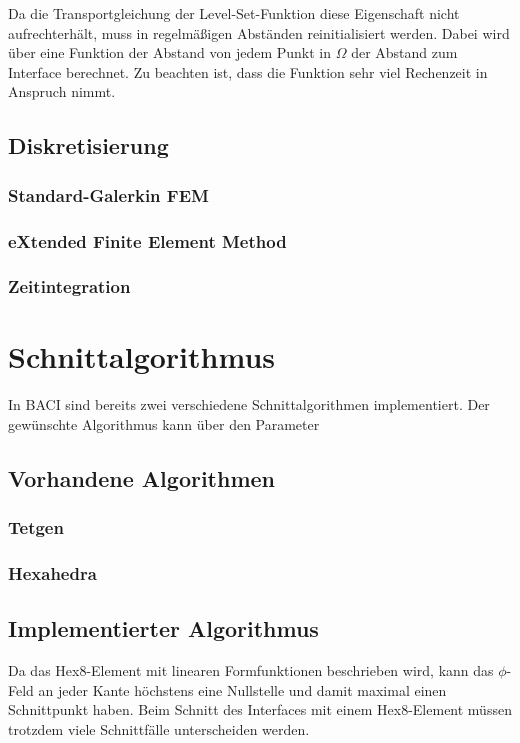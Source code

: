 Da die Transportgleichung der Level-Set-Funktion diese Eigenschaft nicht aufrechterhält, muss in regelmäßigen Abständen reinitialisiert werden. Dabei wird über eine Funktion der Abstand von jedem Punkt in $\Omega$ der Abstand zum Interface berechnet. Zu beachten ist, dass die Funktion sehr viel Rechenzeit in Anspruch nimmt.

\section{Diskretisierung}


%
%
\subsection{Standard-Galerkin FEM}

%
%
\subsection{eXtended Finite Element Method}
\label{sec:xfem}
\subsection{Zeitintegration}


\chapter{Schnittalgorithmus}

In BACI sind bereits zwei verschiedene Schnittalgorithmen implementiert. Der
gewünschte Algorithmus kann über den Parameter 

\section{Vorhandene Algorithmen}
\subsection{Tetgen}
\subsection{Hexahedra}

\section{Implementierter Algorithmus}
Da das Hex8-Element mit linearen Formfunktionen beschrieben
wird, kann das $\phi$-Feld an jeder Kante höchstens eine Nullstelle und
damit maximal einen Schnittpunkt haben.
Beim Schnitt des Interfaces mit einem Hex8-Element müssen trotzdem viele
Schnittfälle unterscheiden werden. \\

